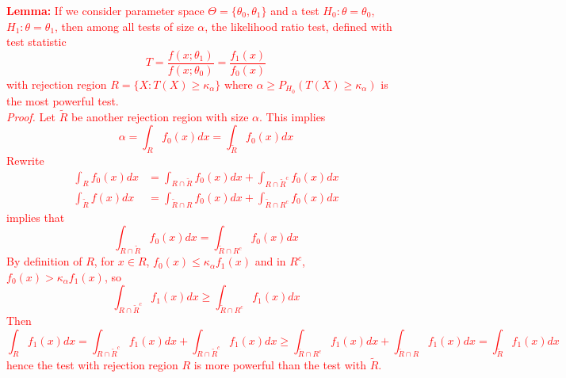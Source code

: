 \documentclass[12pt]{article}
\newcommand{\1}{\mathds 1}
\begin{document}
\begin{enumerate}
\textcolor{red}{
\textbf{Lemma:} If we consider parameter space $\Theta = \{\theta_0, \theta_1\}$ and a test $H_0: \theta = \theta_0$, $H_1 : \theta = \theta_1$, then among all tests of size  $\alpha$, the likelihood ratio test, defined with test statistic 
\begin{equation*}
    T = \frac{f(x ; \theta_1)}{f(x ; \theta_0)} = \frac{f_1(x)}{f_0(x)}
\end{equation*}
with rejection region $R = \{X : T(X) \geq \kappa_\alpha\}$ where $\alpha \geq P_{H_0}(T(X) \geq \kappa_\alpha)$ is the most powerful test. \\
\textit{Proof.} Let $\tilde R$ be another rejection region with size  $\alpha$. This implies 
\begin{equation*}
    \alpha = \int _R f_0(x) dx = \int_{\tilde R} f_0(x) dx
\end{equation*}
Rewrite 
\begin{align*}
    \int_R f_0(x) dx &= \int_{R \cap \tilde R} f_0(x) dx + \int_{R\cap \tilde R^c} f_0(x) dx\\
    \int_{\tilde R} f(x) dx &= \int _{\tilde R \cap R } f_0(x) dx + \int_{\tilde R \cap R^c} f_0(x) dx
\end{align*}
implies that 
\begin{equation*}
    \int_{R \cap \tilde R}f_0(x) dx = \int_{\tilde R \cap R^c} f_0(x) dx
\end{equation*}
By definition of $R$, for $x \in R$, $f_0(x) \leq \kappa_\alpha f_1(x)$ and in $R^c$, $f_0(x) > \kappa_\alpha f_1(x)$, so 
\begin{equation*}
    \int _{R \cap \tilde R^c} f_1(x) dx \geq \int_{\tilde R \cap R^c} f_1(x) dx
\end{equation*}
Then 
\small
\begin{equation*}
    \int_{R} f_1(x) dx = \int_{R \cap \tilde R^c} f_1(x) dx + \int_{R \cap \tilde R^c} f_1(x) dx \geq \int_{\tilde R \cap R^c} f_1(x) dx + \int_{\tilde R \cap R} f_1(x) dx = \int_{\tilde R} f_1(x) dx
\end{equation*}
\normalsize
hence the test with rejection region $R$ is more powerful than the test with $\tilde R$. 
}

\end{enumerate}
\end{document}
